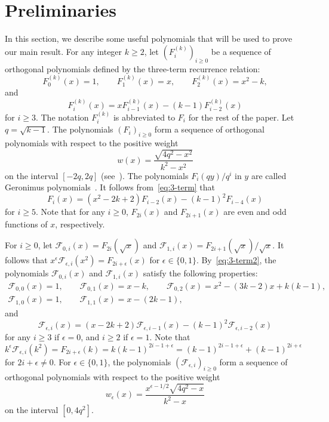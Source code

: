 \documentclass[ALCO,ThmDefs,Unicode,epreuves]{cedram}
\begin{document}
\section{Preliminaries} \label{sec:pre}
In this section, we describe some useful polynomials that will be used to prove our main result. For any integer $k\geq 2$, let $(F_i^{(k)})_{i\geq 0}$ be a sequence of orthogonal polynomials defined by the three-term recurrence relation: 
\begin{equation*}
F_0^{(k)}(x)=1, \qquad F_1^{(k)}(x)=x, \qquad F_2^{(k)}(x)=x^2 - k, 
\end{equation*}
and
\begin{equation} \label{eq:3-term}
F_i^{(k)}(x)=x F_{i-1}^{(k)}(x)- (k-1) F_{i-2}^{(k)}(x)
\end{equation}
for $i\geq 3$. 
The notation $F_i^{(k)}$ is abbreviated to $F_i$ for the rest of the paper. Let $q=\sqrt{k-1}$. The polynomials $(F_i)_{i\geq 0}$ form a sequence of orthogonal polynomials 
with respect to the positive weight
\[
w(x)=\frac{\sqrt{4q^2-x^2}}{k^2-x^2}
\]
on the interval $[-2q, 2q]$ 
(see~\cite[Section~4]{HOb}). 
The polynomials $F_i(q y)/ q^i$ in $y$ are called Geronimus
polynomials~\cite{G30,H15}. 
It follows from~\eqref{eq:3-term} that 
\begin{equation} \label{eq:3-term2}
F_i(x)=(x^2-2k+2) F_{i-2}(x)- (k-1)^2 F_{i-4}(x)
\end{equation}
for $i\geq 5$. Note that for any $i\geq 0$, $F_{2i}(x)$ and $F_{2i+1}(x)$ are 
even and odd functions of $x$, respectively.

For $i\geq 0$, let $\mathscr{F}_{0,i}(x)=F_{2i}(\sqrt{x})$ and $\mathscr{F}_{1,i}(x)=F_{2i+1}(\sqrt{x})/\sqrt{x}$. 
It follows that $x^{\epsilon} \mathscr{F}_{\epsilon,i}(x^2)=F_{2i+\epsilon}(x)$ for $\epsilon\in \{0,1\}$. 
By~\eqref{eq:3-term2}, the polynomials $\mathscr{F}_{0,i}(x)$ and $\mathscr{F}_{1,i}(x)$ satisfy the following properties:
\begin{gather*}
\mathscr{F}_{0,0}(x)=1, \qquad 
\mathscr{F}_{0,1}(x)=x-k, \qquad
\mathscr{F}_{0,2}(x)=x^2-(3k-2)x+k(k-1), 
\\
\mathscr{F}_{1,0}(x)=1, \qquad 
\mathscr{F}_{1,1}(x)=x-(2k-1),
\end{gather*}
and 
\begin{equation} \label{eq:new_3-term}
\mathscr{F}_{\epsilon, i}(x)=(x-2k+2) \mathscr{F}_{\epsilon,i-1}(x)-(k-1)^2 \mathscr{F}_{\epsilon, i-2}(x)
\end{equation}
for any $i\geq 3$ if $\epsilon=0$, and $i\geq 2$ if $\epsilon=1$. 
Note that $k^{\epsilon} \mathscr{F}_{\epsilon,i}(k^2)=F_{2i+\epsilon}(k)=k(k-1)^{2i-1+\epsilon}=(k-1)^{2i-1+\epsilon}+(k-1)^{2i+\epsilon}$ for $2i+\epsilon \ne 0$. 
For $\epsilon\in \{0,1\}$, the polynomials $(\mathscr{F}_{\epsilon,i})_{i\geq 0}$ form a sequence of orthogonal polynomials with respect to the positive weight 
\[
w_\epsilon(x)=\frac{x^{\epsilon-1/2} \sqrt{4q^2-x}}{k^2-x}
\]
on the interval $[0, 4q^2]$. 
\end{document}
